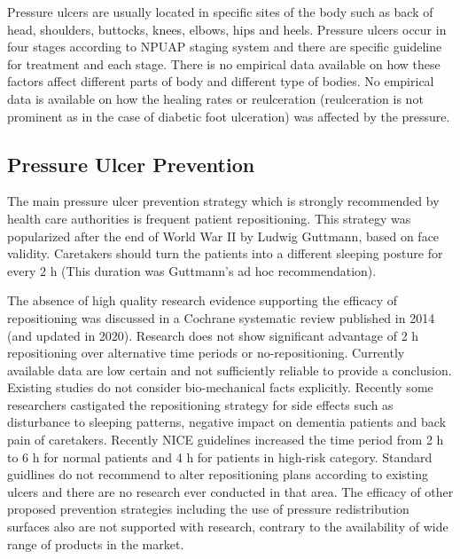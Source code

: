 Pressure ulcers are usually located in specific sites of the body such as back of head, shoulders, buttocks,  knees, elbows, hips and heels. Pressure ulcers occur in four stages according to NPUAP staging system and there are specific guideline for treatment and each stage. There is no empirical data available on how these factors affect different parts of body and different type of bodies. No empirical data is available on how the healing rates or reulceration (reulceration is not prominent as in the case of diabetic foot ulceration) was affected by the pressure.

\subsection{Pressure Ulcer Prevention}
The main pressure ulcer prevention strategy which is strongly recommended by health care authorities is frequent patient repositioning. This strategy was popularized after the end of World War II by Ludwig Guttmann, based on face validity. Caretakers should turn the patients into a different sleeping posture for every 2 h (This duration was Guttmann's ad hoc recommendation). 

The absence of high quality research evidence supporting the efficacy of repositioning was discussed in a Cochrane systematic review published in 2014 (and updated in 2020). Research does not show significant advantage of 2 h repositioning over alternative time periods or no-repositioning. Currently available data are low certain and not sufficiently reliable to provide a conclusion. Existing studies do not consider bio-mechanical facts explicitly. Recently some researchers castigated the repositioning strategy for side effects such as disturbance to sleeping patterns, negative impact on dementia patients and back pain of caretakers. Recently NICE guidelines increased the time period from 2 h to 6 h for normal patients and 4 h for patients in high-risk category. Standard guidlines do not recommend to alter repositioning plans according to existing ulcers and there are no research ever conducted in that area. The efficacy of other proposed prevention strategies including the use of pressure redistribution surfaces also are not supported with research, contrary to the availability of wide range of products in the market.

